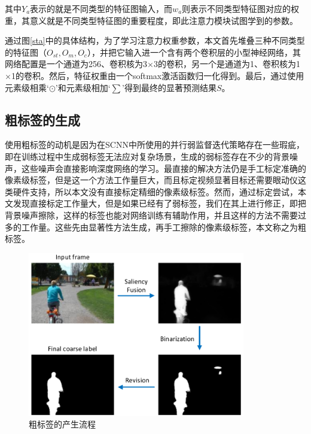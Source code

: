 其中$Y_a$表示的就是不同类型的特征图输入，而$w_a$则表示不同类型特征图对应的权重，其意义就是不同类型特征图的重要程度，即此注意力模块试图学到的参数。

通过图\ref{sta}中的具体结构，为了学习注意力权重参数，本文首先堆叠三种不同类型的特征图（$O_{st}, O_{m}, O_{c}$），并把它输入进一个含有两个卷积层的小型神经网络，其网络配置是一个通道为256、卷积核为3$\times$3的卷积，另一个是通道为1、卷积核为1$\times$1的卷积。然后，特征权重由一个softmax激活函数归一化得到。最后，通过使用元素级相乘`$\odot$'和元素级相加`$\sum$'得到最终的显著预测结果$S$。

\subsection{粗标签的生成}
使用粗标签的动机是因为在SCNN中所使用的并行弱监督迭代策略存在一些瑕疵，即在训练过程中生成弱标签无法应对复杂场景，生成的弱标签存在不少的背景噪声，这些噪声会直接影响深度网络的学习。最直接的解决方法仍是手工标定准确的像素级标签，但是这一个方法工作量巨大，而且标定视频显著目标还需要眼动仪这类硬件支持，所以本文没有直接标定精细的像素级标签。然而，通过标定尝试，本文发现直接标定工作量大，但是如果已经有了弱标签，我们在其上进行修正，即把背景噪声擦除，这样的标签也能对网络训练有辅助作用，并且这样的方法不需要过多的工作量。这些先由显著性方法生成，再手工擦除的像素级标签，本文称之为粗标签。

\begin{figure}
 \centering
\includegraphics[width=9.5cm]{figures/labeling2}
\caption{粗标签的产生流程}
\label{labeling2}
\end{figure}

